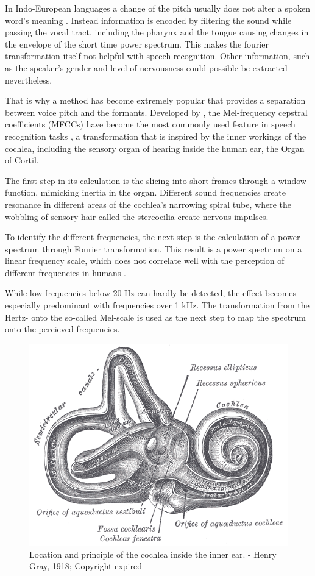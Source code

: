 In Indo-European languages a change of the pitch usually does not alter a spoken word’s meaning \cite{auditoryneuroscience}. Instead information is encoded by filtering the sound while passing the vocal tract, including the pharynx and the tongue causing changes in the envelope of the short time power spectrum. This makes the fourier transformation itself not helpful with speech recognition. Other information, such as the speaker's gender and level of nervousness could possible be extracted nevertheless.

That is why a method has become extremely popular that provides a separation between voice pitch and the formants. Developed by \cite{noll67}, the Mel-frequency cepstral coefficients (MFCCs) have become the most commonly used feature in speech recognition tasks \cite{ganchev2005comparative}, a transformation that is inspired by the inner workings of the cochlea, including the sensory organ of hearing inside the human ear, the Organ of Cortil. 


The first step in its calculation is the slicing into short frames through a window function, mimicking inertia in the organ. Different sound frequencies create resonance in different areas of the cochlea’s narrowing spiral tube, where the wobbling of sensory hair called the stereocilia create nervous impulses.

To identify the different frequencies, the next step is the calculation of a power spectrum through Fourier transformation. This result is a power spectrum on a linear frequency scale, which does not correlate well with the perception of different frequencies in humans \cite{mel}. 

 While low frequencies below 20 Hz can hardly be detected, the effect becomes especially predominant with frequencies over 1 kHz. The transformation from the Hertz- onto the so-called Mel-scale is used as the next step to map the spectrum onto the percieved frequencies. 


\begin{figure}[h]
    \centering
	\includegraphics[width=.8\textwidth]{./images/illustrations/Gray921}
    \caption{Location and principle of the cochlea inside the inner ear. - Henry Gray, 1918; Copyright expired}
    \label{fig:gray}
\end{figure}

